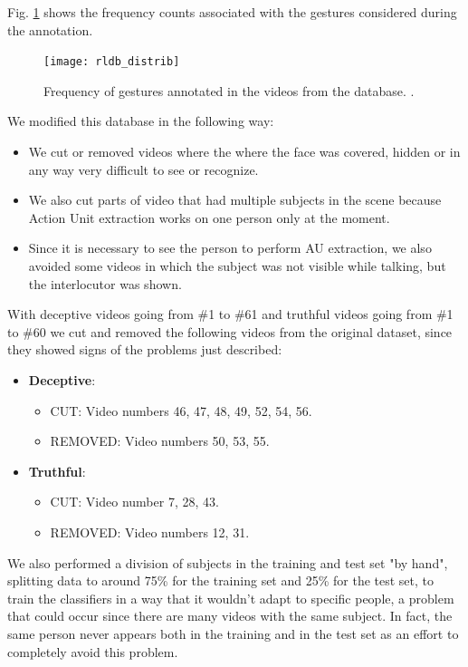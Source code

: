 Fig. \ref{fig:rldb_distrib} shows the frequency counts associated with the gestures considered during the annotation.

\begin{figure}[H]
	\centering
	\texttt{[image: rldb\_distrib]}
	\caption{Frequency of gestures annotated in the videos from the database. \cite{Perez-Rosas:2015:DDU:2818346.2820758}.}
	\label{fig:rldb_distrib}
\end{figure}

We modified this database in the following way:
\begin{itemize}
	\item We cut or removed videos where the where the face was covered, hidden or in  any way very difficult to see or recognize.
	\item We also cut parts of video that had multiple subjects in the scene because Action Unit extraction works on one person only at the moment.
	\item Since it is necessary to see the person to perform AU extraction, we also avoided some videos in which the subject was not visible while talking, but the interlocutor was shown.
\end{itemize}

With deceptive videos going from \#1 to \#61 and truthful videos going from \#1 to \#60 we cut and removed the following videos from the original dataset, since they showed signs of the problems just described:

\begin{itemize}
	\item \textbf{Deceptive}:
	\begin{itemize}
		\item CUT: Video numbers 46, 47, 48, 49, 52, 54, 56.
		\item REMOVED: Video numbers 50, 53,  55.
	\end{itemize}
	\item \textbf{Truthful}:
	\begin{itemize}
		\item CUT: Video number 7, 28, 43.
		\item REMOVED: Video numbers 12, 31. 
	\end{itemize}
\end{itemize}


We also performed a division of subjects in the training and test set "by hand", splitting data to around 75\% for the training set and 25\% for the test set, to train the classifiers in a way that it wouldn't adapt to specific people, a problem that could occur since there are many videos with the same subject. In fact, the same person never appears both in the training and in the test set as an effort to completely avoid this problem.

